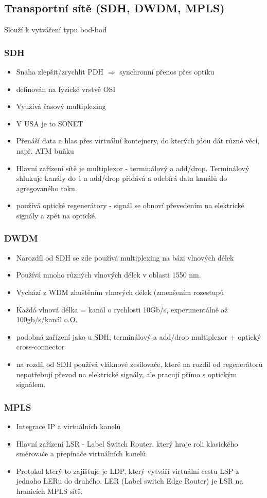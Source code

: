 \documentclass[10pt,a4paper]{article}
\begin{document}
\subsection{Transportní sítě (SDH, DWDM, MPLS)}
Slouží k vytváření typu bod-bod
\subsubsection{SDH}

\begin{itemize}
\item Snaha zlepšit/zrychlit PDH $\Rightarrow$ synchronní přenos přes optiku
\item definován na fyzické vrstvě OSI
\item Využívá časový multiplexing
\item V USA je to SONET
\item Přenáší data a hlas přes virtuální kontejnery, do kterých jdou dát různé věci, např. ATM buňku
\item Hlavní zařízení sítě je multiplexor - terminálový a add/drop. Terminálový shlukuje kanály do 1 a add/drop přidává a odebírá data kanálů do agregovaného toku.
\item používá optické regenerátory - signál se obnoví převedením na elektrické signály a zpět na optické.
\end{itemize}
\subsubsection{DWDM}
\begin{itemize}
\item Narozdíl od SDH se zde používá multiplexing na bázi vlnových délek
\item Používá mnoho různých vlnových délek v oblasti 1550 nm.
\item Vychází z WDM zhuštěním vlnových délek (zmenšením rozestupů
\item Každá vlnová délka = kanál o rychlosti 10Gb/s, experimentálně až 100gb/s/kanál o.O.
\item podobná zařízení jako u SDH, terminálový a add/drop multiplexor + optický cross-connector
\item na rozdíl od SDH používá vláknové zesilovače, které na rozdíl od regenerátorů nepotřebují převod na elektrické signály, ale pracují přímo s optickým signálem.
\end{itemize}

\subsubsection{MPLS}
\begin{itemize}
\item Integrace IP a virtuálních kanelů
\item Hlavní zařízení LSR - Label Switch Router, který hraje roli klasického směrovače a přepínače virtuálních kanelů.
\item Protokol který to zajišťuje je LDP, který vytváří virtuální cestu LSP z jednoho LERu do druhého. LER (Label switch Edge Router) je LSR na hranicích MPLS sítě.
\end{itemize}
\end{document}
